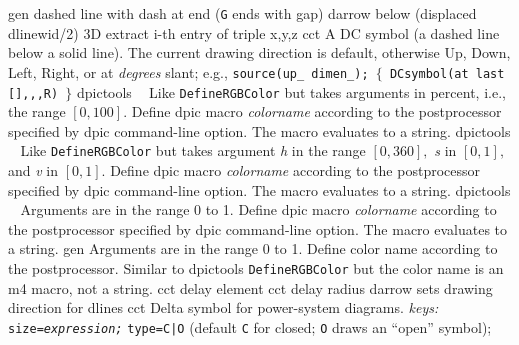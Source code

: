   {gen}%
  {dashed line with dash at end ({\tt G} ends with gap)}%
%
  {darrow}%
  {below (displaced dlinewid/2)}%
%
  {3D}%
  {extract i-th entry of triple x,y,z}%
%
  {cct}%
  {A DC symbol (a dashed line below a solid line).
   The current drawing direction is default, otherwise Up, Down,
   Left, Right, or at {\sl degrees} slant; e.g., 
   {\tt source(up\_ dimen\_); $\lbrace$ DCsymbol(at last [],{},{},R) $\rbrace$}
    }%
%
  {dpictools}%
  {$\;\;$ Like {\tt DefineRGBColor} but takes arguments in percent, i.e.,
    the range $[0,100].$ Define dpic macro {\sl colorname}
    according to the postprocessor specified by dpic command-line option.
    The macro evaluates to a string.}%
%
  {dpictools}%
  {$\;\;$ Like {\tt DefineRGBColor} but takes argument {\sl h} in the
    range $[0,360],$ {\sl s} in $[0,1],$ and {\sl v} in $[0,1].$
    Define dpic macro {\sl colorname}
    according to the postprocessor specified by dpic command-line option.
    The macro evaluates to a string.}%
%
  {dpictools}%
  {$\;\;$ Arguments are in the range 0 to 1. Define dpic macro {\sl colorname}
    according to the postprocessor specified by dpic command-line option.
    The macro evaluates to a string.}%
%
  {gen}%
  {Arguments are in the range 0 to 1. Define color name
    according to the postprocessor.  Similar to dpictools {\tt DefineRGBColor}
    but the color name is an m4 macro, not a string.}%
%
  {cct}%
  {delay element}%
%
  {cct}%
  {delay radius}%
%
  {darrow}%
  {sets drawing direction for dlines}%
%
  {cct}%
  {Delta symbol for power-system diagrams.
   {\sl keys:} {\tt size={\sl expression;}}
    {\tt type=C|O} (default {\tt C} for closed;
      {\tt O} draws an ``open'' symbol); }%
%
